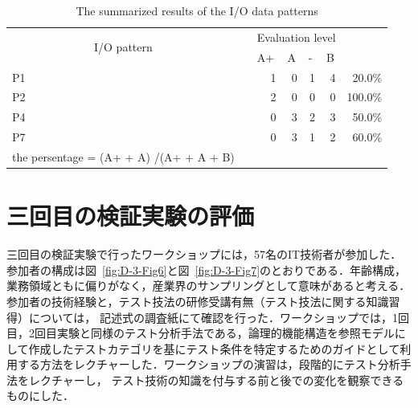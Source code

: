 \documentclass[a4paper,11pt]{jreport}
\begin{document}
\begin{table}[htbp]
  \centering
  \caption{The summarized results of the I/O data patterns}
    \begin{tabular}{lrrrrrr}
\cline{1-6}    \multicolumn{1}{|c}{\multirow{2}[4]{*}{I/O pattern}} & \multicolumn{1}{r|}{} & \multicolumn{4}{c|}{Evaluation level} &  \bigstrut\\
\cline{3-6}    \multicolumn{1}{|c}{} & \multicolumn{1}{r|}{} & \multicolumn{1}{l|}{A+} & \multicolumn{1}{l|}{A} & \multicolumn{1}{l|}{-} & \multicolumn{1}{l|}{B} &  \bigstrut\\
\cline{1-6}    \multicolumn{1}{|l|}{P1} & \multicolumn{1}{r|}{} & \multicolumn{1}{r|}{1} & \multicolumn{1}{r|}{0} & \multicolumn{1}{r|}{1} & \multicolumn{1}{r|}{4} & 20.0\% \bigstrut\\
\cline{1-6}    \multicolumn{1}{|l|}{P2} & \multicolumn{1}{r|}{} & \multicolumn{1}{r|}{2} & \multicolumn{1}{r|}{0} & \multicolumn{1}{r|}{0} & \multicolumn{1}{r|}{0} & 100.0\% \bigstrut\\
\cline{1-6}    \multicolumn{1}{|l|}{P4} & \multicolumn{1}{r|}{} & \multicolumn{1}{r|}{0} & \multicolumn{1}{r|}{3} & \multicolumn{1}{r|}{2} & \multicolumn{1}{r|}{3} & 50.0\% \bigstrut\\
\cline{1-6}    \multicolumn{1}{|l|}{P7} & \multicolumn{1}{r|}{} & \multicolumn{1}{r|}{0} & \multicolumn{1}{r|}{3} & \multicolumn{1}{r|}{1} & \multicolumn{1}{r|}{2} & 60.0\% \bigstrut\\
\cline{1-6}    the persentage = (A+  +  A) /(A+  +  A + B)  &       &       &       &       &       &  \bigstrut[t]\\
    \end{tabular}%
  \label{tbl:D-3-tbl10}%
\end{table}%


\section{三回目の検証実験の評価}

三回目の検証実験で行ったワークショップには，57名のIT技術者が参加した．参加者の構成は図~\ref{fig:D-3-Fig6}と図~\ref{fig:D-3-Fig7}のとおりである．年齢構成，業務領域ともに偏りがなく，産業界のサンプリングとして意味があると考える．参加者の技術経験と，テスト技法の研修受講有無（テスト技法に関する知識習得）については， 記述式の調査紙にて確認を行った．ワークショップでは，1回目，2回目実験と同様のテスト分析手法である，論理的機能構造を参照モデルにして作成したテストカテゴリを基にテスト条件を特定するためのガイドとして利用する方法をレクチャーした．ワークショップの演習は，段階的にテスト分析手法をレクチャーし， テスト技術の知識を付与する前と後での変化を観察できるものにした．
\end{document}
